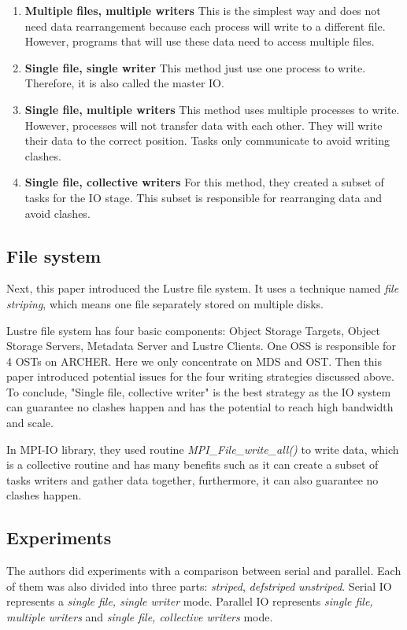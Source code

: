 \documentclass{article}
\begin{document}
\begin{enumerate}
	\item \textbf{Multiple files, multiple writers}
	This is the simplest way and does not need data rearrangement because each process will write to a different file. However, programs that will use these data need to access multiple files.
	\item \textbf{Single file, single writer}
	This method just use one process to write. Therefore, it is also called the master IO.
	\item \textbf{Single file, multiple writers}
	This method uses multiple processes to write. However, processes will not transfer data with each other. They will write their data to the correct position. Tasks only communicate to avoid writing clashes.
	\item \textbf{Single file, collective writers}
	For this method, they created a subset of tasks for the IO stage. This subset is responsible for rearranging data and avoid clashes.
\end{enumerate}

\subsection{File system}
Next, this paper introduced the Lustre file system. It uses a technique named \textit{file striping}, which means one file separately stored on multiple disks.

Lustre file system has four basic components: Object Storage Targets, Object Storage Servers, Metadata Server and Lustre Clients. One OSS is responsible for 4 OSTs on ARCHER. Here we only concentrate on MDS and OST. Then this paper  introduced  potential issues for the four writing strategies discussed above.
To conclude, "Single file, collective writer" is the best strategy  as the IO system can guarantee no clashes happen and has the potential to reach high bandwidth and scale.

In MPI-IO library, they used routine \textit {MPI\_File\_write\_all()} to write data, which is a collective 
routine and has many benefits such as it can create a subset of tasks writers and gather data together, furthermore, it can also guarantee no clashes happen.

\subsection{Experiments}
The authors did experiments with a comparison between serial and parallel. Each of them was also divided into three parts: \textit{striped}, \textit{defstriped} \textit{unstriped}. Serial IO represents a \textit{single file, single writer} mode. Parallel IO represents \textit{single file, multiple writers} and \textit{single file, collective writers} mode.
\end{document}
